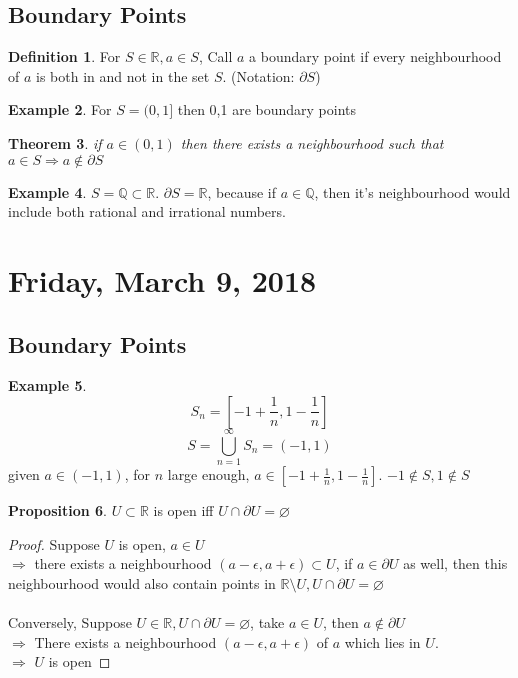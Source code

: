 \documentclass[12pt]{article}
\theoremstyle{plain}
\newtheorem{theorem}{Theorem}[section]
\theoremstyle{definition}
\newtheorem{definition}[theorem]{Definition}
\newtheorem{example}[theorem]{Example}
\newtheorem{proposition}[theorem]{Proposition}
\begin{document}
\subsection{Boundary Points}

\begin{definition}
	For $S\in\mathbb{R}, a \in S$, Call $a$ a boundary point if every neighbourhood of $a$ is both in and not in the set $S$. (Notation: $\partial S$)
\end{definition}

\begin{example}
	For $S = (0,1]$ then 0,1 are boundary points
\end{example}

\begin{theorem}
	if $a \in (0,1)$ then there exists a neighbourhood such that $a\in S \Longrightarrow a \not\in \partial S$
\end{theorem}

\begin{example}
	$S = \mathbb{Q} \subset \mathbb{R}$. $\partial S = \mathbb{R}$, because if $a\in \mathbb{Q}$, then it's neighbourhood would include both rational and irrational numbers.
\end{example}






\newpage

\section{Friday, March 9, 2018}

\subsection{Boundary Points}

\begin{example}
	$$S_n = [-1 + \frac{1}{n}, 1- \frac{1}{n}]$$
	$$S = \bigcup^\infty_{n=1} S_n = (-1,1)$$ given $a\in(-1,1)$, for $n$ large enough, $a\in [-1 + \frac{1}{n}, 1- \frac{1}{n}]$. $-1 \not\in S, 1 \not\in S$
\end{example}

\begin{proposition}
	$U \subset \mathbb{R}$ is open iff $U \cap \partial U = \varnothing$
\end{proposition}

\begin{proof}
	Suppose $U$ is open, $a \in U$\\
	$\Longrightarrow$ there exists a neighbourhood $(a-\epsilon, a+\epsilon) \subset U$, if $a\in \partial U$ as well, then this neighbourhood would also contain points in $\mathbb{R} \setminus U, U\cap \partial U = \varnothing $\\
	\\
	Conversely, Suppose $U \in \mathbb{R}, U\cap \partial U = \varnothing$, take $a \in U$, then $a \not\in \partial U$\\
	$\Longrightarrow$ There exists a neighbourhood $(a-\epsilon, a+\epsilon)$ of $a$ which lies in $U$.\\
	$\Longrightarrow$ $U$ is open
\end{proof}
\end{document}
